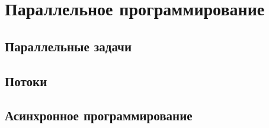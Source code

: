 \section{Параллельное программирование}

\subsection{Параллельные задачи}

\subsection{Потоки}

\subsection{Асинхронное программирование}